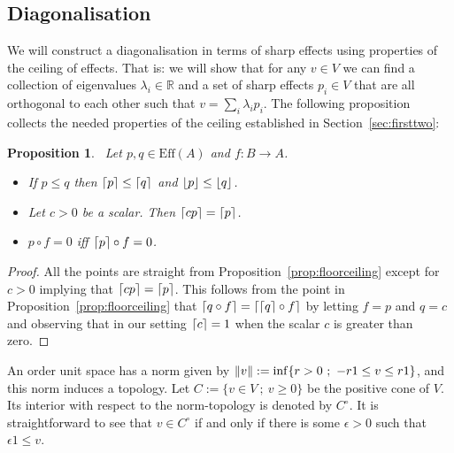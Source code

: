 \documentclass[b5paper,onecolumn,12pt,accepted=2019-05-03, issue=1, volume=1, shorttitle=papers/compositionality-1-1]{compositionalityarticle}
\DeclarePairedDelimiter{\ceil}{\lceil}{\rceil}
\DeclarePairedDelimiter{\floor}{\lfloor}{\rfloor}
\newcounter{counter}
\numberwithin{counter}{section}
\newtheorem{proposition}[counter]{Proposition}
\newcommand{\R}{\mathbb{R}}
\newcommand{\pred}{\text{Eff}}
\begin{document}
\subsection{Diagonalisation}\label{sec:diagonalisation}
We will construct a diagonalisation in terms of sharp effects using properties of the ceiling of effects. That is: we will show that for any $v\in V$ we can find a collection of eigenvalues $\lambda_i\in \R$ and a set of sharp effects $p_i\in V$ that are all orthogonal to each other such that $v=\sum_i \lambda_i p_i$. The following proposition collects the needed properties of the ceiling established in Section~\ref{sec:firsttwo}:
\begin{proposition}~\label{prop:ceilings}
	Let $p,q\in \pred(A)$  and $f:B\rightarrow A$.
	\begin{itemize}
		\item If $p\leq q$ then $\ceil{p}\leq \ceil{q}$ and $\floor{p}\leq \floor{q}$.
		\item Let $c>0$ be a scalar. Then $\ceil{cp}=\ceil{p}$.
		\item $p\circ f = 0$ iff $\ceil{p}\circ f = 0$.
	\end{itemize}
\end{proposition}
\begin{proof}
	All the points are straight from Proposition~\ref{prop:floorceiling} except for $c>0$ implying that $\ceil{cp}=\ceil{p}$. This follows from the point in Proposition~\ref{prop:floorceiling} that $\ceil{q\circ f}=\ceil{\ceil{q}\circ f}$ by letting $f=p$ and $q=c$ and observing that in our setting $\ceil{c}=1$ when the scalar $c$ is greater than zero.
\end{proof}

An order unit space has a norm given by $\norm{v}:=\inf\{r>0~;~-r1\leq v\leq r1\}$, and this norm induces a topology. Let $C := \{v\in V~;~ v\geq 0\}$ be the positive cone of $V$. Its interior with respect to the norm-topology is denoted by $C^\circ$. It is straightforward to see that $v\in C^\circ$ if and only if there is some $\epsilon>0$ such that $\epsilon 1 \leq v$.
\end{document}
